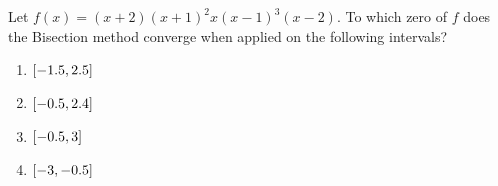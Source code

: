 \documentclass[../../Assignments.tex]{subfiles}
\begin{document}
\begin{exercise}
    Let \(f(x) = (x + 2) (x+1)^2 x (x - 1)^3 (x - 2)\). To which zero of \(f\)
    does the Bisection method converge when applied on the following intervals?

    \begin{multicols}{4}
        \begin{enumerate}[label = (\alph*)]
            \item \(\interval{\num{-1.5}}{\num{2.5}}\)
            \item \(\interval{\num{-0.5}}{\num{2.4}}\)
            \item \(\interval{\num{-0.5}}{3}\)
            \item \(\interval{-3}{\num{-0.5}}\)
        \end{enumerate}
    \end{multicols}
\end{exercise}
\end{document}

